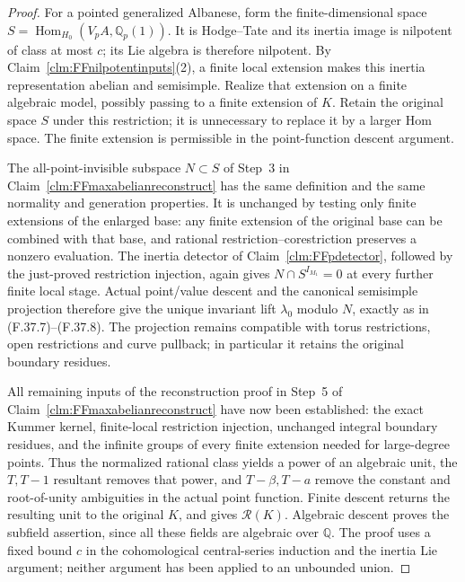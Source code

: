 \documentclass[11pt]{article}
\begin{document}
\begin{proof}
For a pointed generalized Albanese,
form the finite-dimensional space
\(S=\operatorname{Hom}_{H_0}(V_pA,\mathbb Q_p(1))\).
It is Hodge--Tate and its inertia
image is nilpotent of class at
most \(c\); its Lie algebra
is therefore nilpotent.
By Claim~\ref{clm:FFnilpotentinputs}(2),
a finite local extension makes
this inertia representation abelian
and semisimple. Realize that
extension on a finite algebraic
model, possibly passing to a
finite extension of \(K\).
Retain the original space \(S\)
under this restriction; it is
unnecessary to replace it by
a larger Hom space. The finite
extension is permissible in the
point-function descent argument.

The all-point-invisible subspace
\(N\subset S\) of Step~3 in
Claim~\ref{clm:FFmaxabelianreconstruct}
has the same definition and the
same normality and generation
properties. It is unchanged by
testing only finite extensions
of the enlarged base: any finite
extension of the original base
can be combined with that base,
and rational restriction--corestriction
preserves a nonzero evaluation.
The inertia detector of
Claim~\ref{clm:FFpdetector}, followed
by the just-proved restriction
injection, again gives
\(N\cap S^{I_{M_1}}=0\) at
every further finite local stage.
Actual point/value descent and
the canonical semisimple projection
therefore give the unique invariant
lift \(\lambda_0\) modulo \(N\),
exactly as in (F.37.7)--(F.37.8).
The projection remains compatible
with torus restrictions, open
restrictions and curve pullback;
in particular it retains the
original boundary residues.

All remaining inputs of the
reconstruction proof in Step~5
of Claim~\ref{clm:FFmaxabelianreconstruct}
have now been established: the
exact Kummer kernel, finite-local
restriction injection, unchanged
integral boundary residues, and
the infinite groups of every
finite extension needed for
large-degree points. Thus the
normalized rational class yields
a power of an algebraic unit,
the \(T,T-1\) resultant removes
that power, and \(T-\beta,T-a\)
remove the constant and root-of-unity
ambiguities in the actual point
function. Finite descent returns
the resulting unit to the
original \(K\), and
\citep[Theorem~4.18(5)]{FF_CHW2024}
gives \(\mathcal R(K)\).
Algebraic descent proves the
subfield assertion, since all
these fields are algebraic
over \(\mathbb Q\).
The proof uses a fixed bound
\(c\) in the cohomological
central-series induction and
the inertia Lie argument;
neither argument has been
applied to an unbounded union.
\end{proof}
\end{document}

